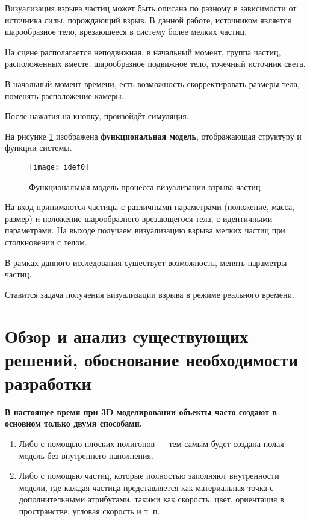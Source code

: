 Визуализация взрыва частиц может быть описана по разному в зависимости от источника силы, порождающий взрыв. В данной работе, источником является шарообразное тело, врезающееся в систему более мелких частиц.
	
На сцене располагается неподвижная, в начальный момент, группа частиц, расположенных вместе, шарообразное подвижное тело, точечный источник света.
	
В начальный момент времени, есть возможность скорректировать размеры тела, поменять расположение камеры.
	
После нажатия на кнопку, произойдёт симуляция.

На рисунке \ref{img:idef0} изображена \textbf{функциональная модель}, отображающая структуру и функции системы. 

\begin{figure}[H]
	\centering
	\texttt{[image: idef0]}
	\caption{Функциональная модель процесса визуализации взрыва частиц}
	\label{img:idef0}
\end{figure}

На вход принимаются частицы с различными параметрами (положение, масса, размер) и положение шарообразного врезающегося тела, с идентичными параметрами. На выходе получаем визуализацию взрыва мелких частиц при столкновении с телом. 

В рамках данного исследования существует возможность, менять параметры частиц. 

Ставится задача получения визуализации взрыва в режиме реального времени. 

\section{\textbf{Обзор и анализ существующих решений, обоснование необходимости разработки}}

\textbf{В настоящее время при 3D моделировании объекты часто создают в основном только двумя способами.} \cite{3dgraphic}
\begin{enumerate}
	\item Либо с помощью плоских полигонов — тем самым будет создана полая модель без внутреннего наполнения. 
	\item Либо с помощью частиц, которые полностью заполняют внутренности модели, где каждая частица представляется как материальная точка с дополнительными атрибутами, такими как скорость, цвет, ориентация в пространстве, угловая скорость и т. п.
\end{enumerate}

